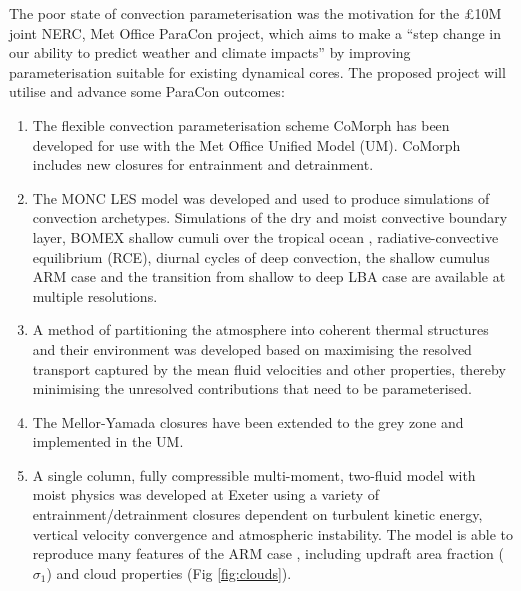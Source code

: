 \documentclass[11pt,a4paper]{article}
\begin{document}
The poor state of convection parameterisation was the motivation for the \pounds 10M joint NERC, Met Office ParaCon project, which aims to make a ``step change in our ability to predict weather and climate impacts'' by improving parameterisation suitable for existing dynamical cores. The proposed project will utilise and advance some ParaCon outcomes:
\begin{enumerate}
\item The flexible convection parameterisation scheme CoMorph has been developed for use with the Met Office Unified Model (UM). CoMorph includes new closures for entrainment and detrainment.

\item The MONC LES model was developed and used to produce simulations of convection archetypes. Simulations of the dry and moist convective boundary layer, BOMEX shallow cumuli over the tropical ocean \cite[]{HR73}, radiative-convective equilibrium (RCE), diurnal cycles of deep convection, the shallow cumulus ARM case \cite[]{BCC+02} and the transition from shallow to deep LBA case \cite[]{BFGB02} are available at multiple resolutions.

\item A method of partitioning the atmosphere into coherent thermal structures and their environment was developed \cite[]{ETB20} based on maximising the resolved transport captured by the mean fluid velocities and other properties, thereby minimising the unresolved contributions that need to be parameterised.

\item The Mellor-Yamada closures have been extended to the grey zone and implemented in the UM.

\item A single column, fully compressible multi-moment, two-fluid model with moist physics was developed at Exeter using a variety of entrainment/detrainment closures dependent on turbulent kinetic energy, vertical velocity convergence and atmospheric instability. The model is able to reproduce many features of the ARM case \cite[]{BCC+02}, including updraft area fraction ($\sigma_1$)  and cloud properties (Fig \ref{fig:clouds}).


\end{enumerate}
\end{document}
